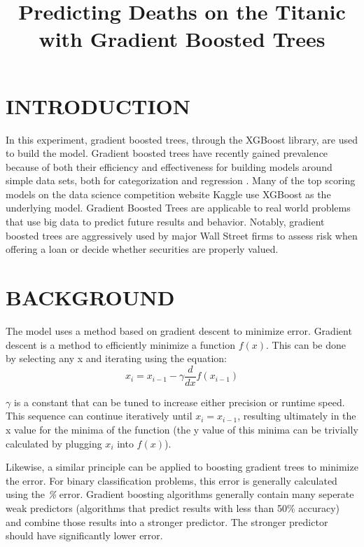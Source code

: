 \documentclass[12pt]{article}
\title{Predicting Deaths on the Titanic with Gradient Boosted Trees}
\author{\sc{Ethan Reese}}
\begin{document}
      \maketitle

    \section{INTRODUCTION}
     In this experiment, gradient boosted trees, through the XGBoost library, are used to build the model. Gradient boosted trees have recently gained prevalence because of both their efficiency and effectiveness for building models around simple data sets, both for categorization and regression \cite{one}. Many of the top scoring models on the data science competition website Kaggle use XGBoost as the underlying model. Gradient Boosted Trees are applicable to real world problems that use big data to predict future results and behavior. Notably, gradient boosted trees are aggressively used by major Wall Street firms to assess risk when offering a loan or decide whether securities are properly valued.

     \section{BACKGROUND}
     The model uses a method based on gradient descent to minimize error. Gradient descent is a method to efficiently minimize a function $f(x)$. This can be done by selecting any x and iterating using the equation:
    \begin{equation}
      x_i = x_{i-1} - \gamma\frac{d}{dx}f(x_{i-1})
    \end{equation}

    $ \gamma $ is a constant that can be tuned to increase either precision or runtime speed. This sequence can continue iteratively until $x_i = x_{i-1}$, resulting ultimately in the x value for the minima of the function (the y value of this minima can be trivially calculated by plugging $x_i$ into $f(x)$).

    Likewise, a similar principle can be applied to boosting gradient trees to minimize the error. For binary classification problems, this error is generally calculated using the \textit{\%} error. Gradient boosting algorithms generally contain many seperate weak predictors (algorithms that predict results with less than 50\% accuracy) and combine those results into a stronger predictor. The stronger predictor should have significantly lower error.
\end{document}

